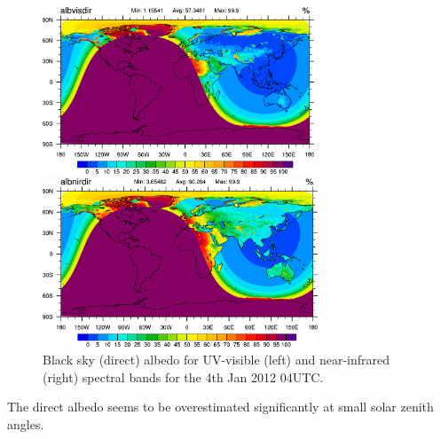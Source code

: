 \documentclass[a4paper,11pt]{article}
\begin{document}
\begin{figure}[hbt]
\begin{minipage}[t]{\textwidth}
  \begin{minipage}[t]{0.498\textwidth}
    \center
    \includegraphics[width=8.1cm]{albvisdir_20120601_blacksky_ritter.png}
  \end{minipage}
  \begin{minipage}[t]{0.498\textwidth}
    \center
    \includegraphics[width=8.2cm]{albnirdir_20120601_blacksky_ritter.png}
  \end{minipage}
\end{minipage}
\caption{Black sky (direct) albedo for UV-visible (left) and near-infrared (right) spectral bands for the 4th Jan 2012 04UTC.}\label{fig_albdir}
\end{figure}

The direct albedo seems to be overestimated significantly at small solar zenith angles.
\end{document}
